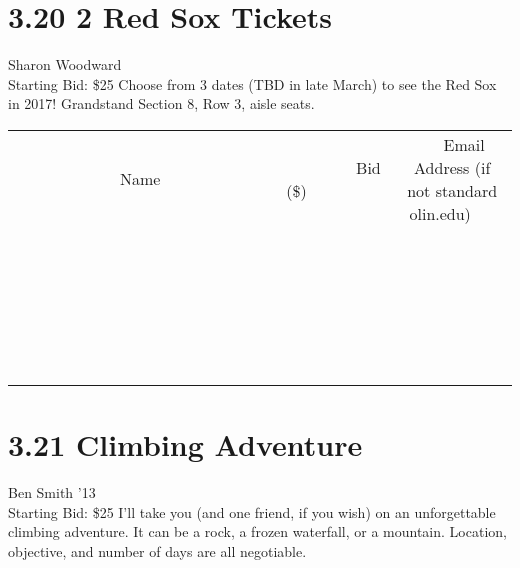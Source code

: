 \documentclass[11pt]{article}
\begin{document}
\section*{3.20 2 Red Sox Tickets }
Sharon Woodward
\\
Starting Bid: \$25
\newline
Choose from 3 dates (TBD in late March) to see the Red Sox in 2017!  Grandstand Section 8, Row 3, aisle seats.
\\[6ex]
\begin{tabular}{c c c}
~~~~~~~~~~~~~Name~~~~~~~~~~~~~ & ~~~~~~~~~Bid (\$)~~~~~~~~~  & ~~~Email Address (if not standard olin.edu)~~~\\
 & & \\
\hline
 & & \\
\hline
 & & \\
\hline
 & & \\
\hline
 & & \\
\hline
 & & \\
\hline
 & & \\
\hline
 & & \\
\hline
 & & \\
\hline
 & & \\
\hline
 & & \\
\hline
 & & \\
\hline
 & & \\
\hline
 & & \\
\hline
 & & \\
\hline
 & & \\
\hline
 & & \\
\hline
 & & \\
\hline
 & & \\
\hline
 & & \\
\hline
 & & \\
\hline
 & & \\
\hline
 & & \\
\hline
 & & \\
\hline
 & & \\
\hline
 & & \\
\hline
\end{tabular}
\newpage
\section*{3.21 Climbing Adventure}
Ben Smith '13
\\
Starting Bid: \$25
\newline
I'll take you (and one friend, if you wish) on an unforgettable climbing adventure. It can be a rock, a frozen waterfall, or a mountain. Location, objective, and number of days are all negotiable. 
\end{document}
